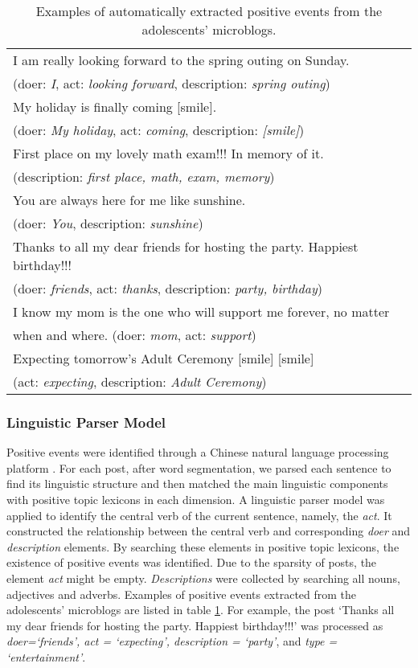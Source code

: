 \documentclass[5p,times,numbers,authoryear]{elsarticle}
\begin{document}
\begin{table}[h]
\begin{center}
\caption{\small{Examples of automatically extracted positive events from the adolescents' microblogs.}}
\small{
\begin{tabular}{|l|} \hline
I am really looking forward to the spring outing on Sunday. \\
(doer: \emph{I}, act: \emph{looking forward}, description: \emph{spring outing})\\\hline
My holiday is finally coming [smile]. \\
(doer: \emph{My holiday}, act: \emph{coming}, description: \emph{[smile]})\\\hline
First place on my lovely math exam!!! In memory of it.\\
(description: \emph{first place, math, exam, memory})\\\hline
You are always here for me like sunshine. \\
(doer: \emph{You}, description: \emph{sunshine})\\\hline
Thanks to all my dear friends for hosting the party.
Happiest birthday!!!\\
(doer: \emph{friends}, act: \emph{thanks}, description: \emph{party, birthday})\\\hline
I know my mom is the one who will support me forever, no matter \\
when and where. (doer: \emph{mom}, act: \emph{support})\\ \hline
Expecting tomorrow's Adult Ceremony [smile] [smile]~~\\
(act: \emph{expecting}, description: \emph{Adult Ceremony})\\\hline
\end{tabular}}
\label{tab:uplifts}
\end{center}
\end{table}

\subsubsection{Linguistic Parser Model}
Positive events were identified through a Chinese natural language processing platform \citep{Che2010}.
For each post, after word segmentation, we parsed each sentence to find its linguistic structure
and then matched the main linguistic components with positive topic lexicons in each dimension.
A linguistic parser model was applied to identify the central verb of the current sentence, namely, the \emph{act}.
It constructed the relationship between the central verb and corresponding \emph{doer} and \emph{description} elements.
By searching these elements in positive topic lexicons, the existence of positive events was identified.
Due to the sparsity of posts, the element \emph{act} might be empty.
\emph{Descriptions} were collected by searching all nouns, adjectives and adverbs.
Examples of positive events extracted from the adolescents' microblogs are listed in table \ref{tab:uplifts}.
For example, the post `Thanks all my dear friends for hosting the party. Happiest birthday!!!'
was processed as \emph{doer=`friends', act = `expecting', description = `party'},
and \emph{type = `entertainment'}.
\end{document}
